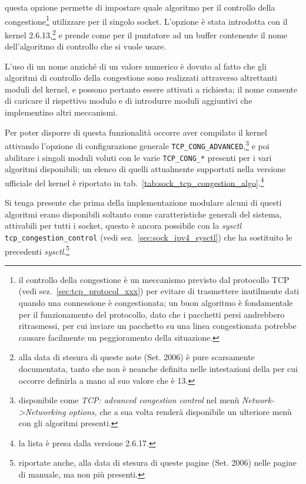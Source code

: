 \begin{basedescript}{\desclabelwidth{1.5cm}\desclabelstyle{\nextlinelabel}}
\item[\constd{TCP\_CONGESTION}] questa opzione permette di impostare quale
  algoritmo per il controllo della congestione\footnote{il controllo della
    congestione è un meccanismo previsto dal protocollo TCP (vedi
    sez.~\ref{sec:tcp_protocol_xxx}) per evitare di trasmettere inutilmente
    dati quando una connessione è congestionata; un buon algoritmo è
    fondamentale per il funzionamento del protocollo, dato che i pacchetti
    persi andrebbero ritrasmessi, per cui inviare un pacchetto su una linea
    congestionata potrebbe causare facilmente un peggioramento della
    situazione.} utilizzare per il singolo socket. L'opzione è stata
  introdotta con il kernel 2.6.13,\footnote{alla data di stesura di queste
    note (Set. 2006) è pure scarsamente documentata, tanto che non è neanche
    definita nelle intestazioni della  per cui occorre definirla a
    mano al suo valore che è 13.} e prende come per  il
  puntatore ad un buffer contenente il nome dell'algoritmo di controllo che
  si vuole usare. 

  L'uso di un nome anziché di un valore numerico è dovuto al fatto che gli
  algoritmi di controllo della congestione sono realizzati attraverso
  altrettanti moduli del kernel, e possono pertanto essere attivati a
  richiesta; il nome consente di caricare il rispettivo modulo e di introdurre
  moduli aggiuntivi che implementino altri meccanismi. 

  Per poter disporre di questa funzionalità occorre aver compilato il kernel
  attivando l'opzione di configurazione generale
  \texttt{TCP\_CONG\_ADVANCED},\footnote{disponibile come \textit{TCP:
      advanced congestion control} nel menù \textit{Network->Networking
      options}, che a sua volta renderà disponibile un ulteriore menù con gli
    algoritmi presenti.} e poi abilitare i singoli moduli voluti con le varie
  \texttt{TCP\_CONG\_*} presenti per i vari algoritmi disponibili; un elenco
  di quelli attualmente supportati nella versione ufficiale del kernel è
  riportato in tab.~\ref{tab:sock_tcp_congestion_algo}.\footnote{la lista è
    presa dalla versione 2.6.17.}


  Si tenga presente che prima della implementazione modulare alcuni di questi
  algoritmi erano disponibili soltanto come caratteristiche generali del
  sistema, attivabili per tutti i socket, questo è ancora possibile con la
  \textit{sysctl} \texttt{tcp\_congestion\_control} (vedi
  sez.~\ref{sec:sock_ipv4_sysctl}) che ha sostituito le precedenti
  \textit{sysctl}.\footnote{riportate anche, alla data di stesura di queste
    pagine (Set. 2006) nelle pagine di manuale, ma non più presenti.}


\end{basedescript}
